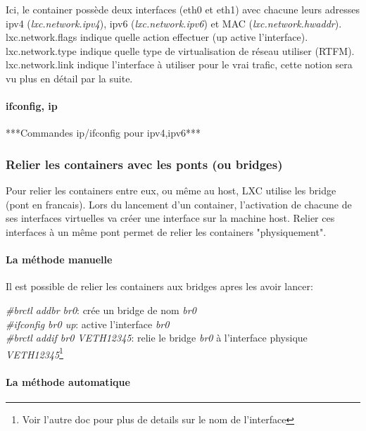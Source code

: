 Ici, le container poss\`ede deux interfaces (eth0 et eth1) avec chacune leurs adresses ipv4 (\emph{lxc.network.ipv4}),
ipv6 (\emph{lxc.network.ipv6}) et MAC (\emph{lxc.network.hwaddr}).\\
lxc.network.flags indique quelle action effectuer (up active l'interface).\\
lxc.network.type indique quelle type de virtualisation de réseau utiliser (RTFM).\\
lxc.network.link indique l'interface \`a utiliser pour le vrai trafic, cette notion sera vu plus en d\'etail par la suite.\\

\paragraph{ifconfig, ip}

***Commandes ip/ifconfig pour ipv4,ipv6***

\subsubsection{Relier les containers avec les ponts (ou bridges)}

Pour relier les containers entre eux, ou m\^eme au host, LXC utilise les bridge (pont en francais). Lors du
lancement d'un container, l'activation de chacune de ses interfaces virtuelles va cr\'eer une interface sur la machine
host. Relier ces interfaces \`a un m\^eme pont permet de relier les containers "physiquement".

\paragraph{La m\'ethode manuelle}

Il est possible de relier les containers aux bridges apres les avoir lancer:

\noindent
\emph{\#brctl addbr br0}: cr\'ee un bridge de nom \emph{br0}\\
\emph{\#ifconfig br0 up}: active l'interface \emph{br0}\\
\emph{\#brctl addif br0 VETH12345}: relie le bridge \emph{br0} \`a l'interface physique \emph{VETH12345}\footnote{Voir l'autre doc pour plus de details sur le nom de l'interface}\\

\paragraph{La m\'ethode automatique}

